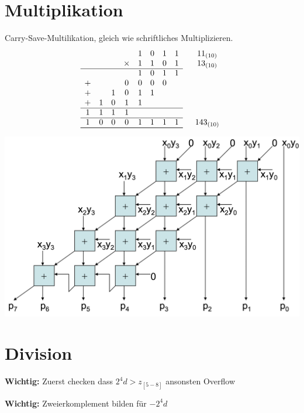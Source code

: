 \documentclass[a4paper,6pt]{article}
\begin{document}
\begin{multicols*}{3}
\section{Multiplikation}

Carry-Save-Multilikation, gleich wie schriftliches Multiplizieren.
$$
\begin{array}{cccccccccc}
      &   &   &   & 1 & 0 & 1 & 1 &   & 11_{(10)} \\
      &   &   & \times & 1 & 1 & 0 & 1 &   & 13_{(10)} \\ \cline{1-8}
      &   &   &   & 1 & 0 & 1 & 1 &   &  \\
    + &   &   & 0 & 0 & 0 & 0 &   &   &  \\
    + &   & 1 & 0 & 1 & 1 &   &   &   &  \\
    + & 1 & 0 & 1 & 1 &   &   &   &   &  \\ \cline{1-8}
    1 & 1 & 1 & 1 &   &   &   &   &   &  \\ \cline{1-8}
    1 & 0 & 0 & 0 & 1 & 1 & 1 & 1 &   & 143_{(10)} \\ \cline{1-8} \cline{1-8}
\end{array}
$$

\begin{center}
    \includegraphics[width=1\linewidth]{resources/Multiplikation.png}
\end{center}

\section{Division}


\textbf{Wichtig:} Zuerst checken dass $2^4 d > z_{[5-8]}$ ansonsten Overflow

\textbf{Wichtig:} Zweierkomplement bilden für $-2^4 d$


\end{multicols*}
\end{document}
